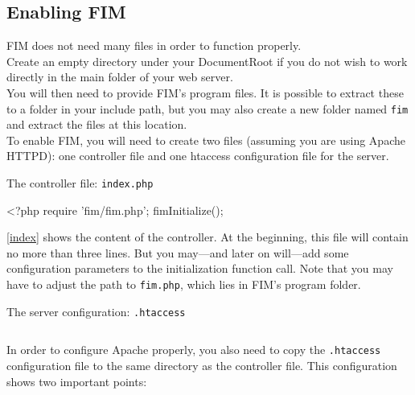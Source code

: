 \documentclass{scrartcl}
\begin{document}
   \subsection{Enabling FIM}
      FIM does not need many files in order to function properly. \\
      Create an empty directory under your DocumentRoot if you do not wish to work directly in the main folder of your web server. \\
      You will then need to provide FIM's program files. It is possible to extract these to a folder in your include path, but you may also create a new folder named \texttt{fim} and extract the files at this location. \\
      To enable FIM, you will need to create two files (assuming you are using Apache HTTPD): one controller file and one htaccess configuration file for the server.
      \begin{listing}[H]
         \caption{The controller file: \texttt{index.php}}
         \label{index}
         \begin{phpcode}
<?php
   require 'fim/fim.php';
   fimInitialize();
         \end{phpcode}
      \end{listing}
      \autoref{index} shows the content of the controller. At the beginning, this file will contain no more than three lines. But you may---and later on will---add some configuration parameters to the initialization function call. Note that you may have to adjust the path to \texttt{fim.php}, which lies in FIM's program folder.
      \begin{listing}[H]
         \caption{The server configuration: \texttt{.htaccess}}
         \label{htaccess}
         \inputminted{apache}{demo/.htaccess}
      \end{listing}
      In order to configure Apache properly, you also need to copy the \texttt{.htaccess} configuration file to the same directory as the controller file. This configuration shows two important points:
\end{document}
